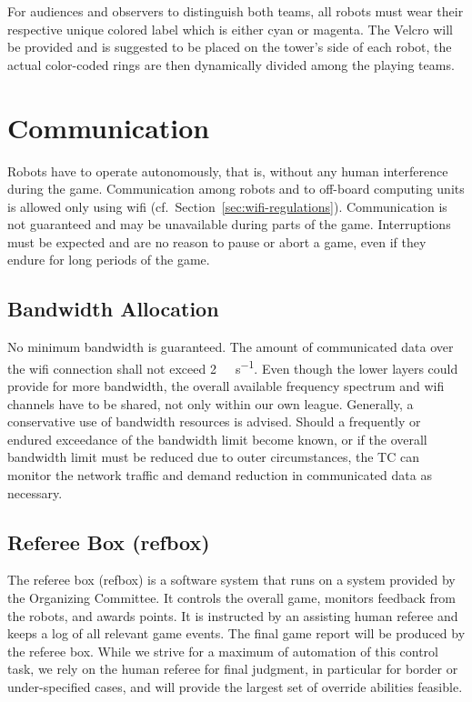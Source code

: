 \documentclass[12pt,twoside]{article}
\newcommand{\refsec}[1]{Section~\ref{#1}}
\begin{document}
For audiences and observers to distinguish both teams, all robots must
wear their respective unique colored label which is either cyan or
magenta.  The Velcro will be provided and is suggested to be placed on
the tower's side of each robot, the actual color-coded rings are then
dynamically divided among the playing teams.

\section{Communication}
\label{sec:communication}

Robots have to operate autonomously, that is, without any human
interference during the game. Communication among robots and to
off-board computing units is allowed only using wifi
(cf.~\refsec{sec:wifi-regulations}). Communication is not guaranteed
and may be unavailable during parts of the game. Interruptions must be
expected and are no reason to pause or abort a game, even if they
endure for long periods of the game.

\subsection{Bandwidth Allocation}
\label{sec:bandwidth}
No minimum bandwidth is guaranteed. The amount of communicated data
over the wifi connection shall not exceed
\SI[per-mode=symbol]{2}{\mega\bit\per\second}. Even though the lower
layers could provide for more bandwidth, the overall available
frequency spectrum and wifi channels have to be shared, not only
within our own league. Generally, a conservative use of bandwidth
resources is advised. Should a frequently or endured exceedance of the
bandwidth limit become known, or if the overall bandwidth limit must
be reduced due to outer circumstances, the TC can monitor the network
traffic and demand reduction in communicated data as necessary.

\subsection{Referee Box (refbox)}
\label{sec:referee-box}
The referee box (refbox) is a software system that runs on a system
provided by the Organizing Committee. It controls the overall game,
monitors feedback from the robots, and awards points. It is instructed
by an assisting human referee and keeps a log of all relevant game
events. The final game report will be produced by the referee
box. While we strive for a maximum of automation of this control task,
we rely on the human referee for final judgment, in particular for
border or under-specified cases, and will provide the largest set of
override abilities feasible.
\end{document}
